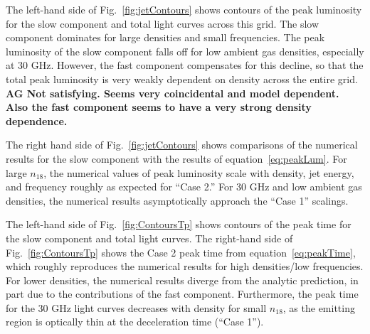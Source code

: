 \documentclass[usenatbib,fleqn]{mnras}
\begin{document}
The left-hand side of Fig.~\ref{fig:jetContours} shows contours of the
peak luminosity for the slow component and total light curves across
this grid. The slow component dominates for large
densities and small frequencies.  The peak luminosity of the slow
component falls off for low ambient gas densities, especially at 30
GHz. However, the fast component compensates for this decline, so that
the total peak luminosity is very weakly dependent on density across
the entire grid. {\bf AG Not satisfying. Seems very coincidental and
  model dependent. Also the fast component seems to have a very strong
density dependence.}

The right hand side of Fig.~\ref{fig:jetContours} shows comparisons of
the numerical results for the slow component with the results of
equation~\eqref{eq:peakLum}. For large $n_{18}$, the numerical values
of peak luminosity scale with density, jet energy, and frequency
roughly as expected for ``Case 2.'' For 30 GHz and low ambient gas
densities, the numerical results asymptotically approach the ``Case
1'' scalings.

The left-hand side of Fig.~\ref{fig:ContoursTp} shows contours of the
peak time for the slow component and total light curves. The
right-hand side of Fig.~\ref{fig:ContoursTp} shows the Case 2 peak
time from equation~\eqref{eq:peakTime}, which roughly reproduces the
numerical results for high densities/low frequencies. For lower
densities, the numerical results diverge from the analytic prediction,
in part due to the contributions of the fast component.  Furthermore,
the peak time for the 30 GHz light curves decreases with density for
small $n_{18}$, as the emitting region is optically thin at the
deceleration time (``Case 1'').
\end{document}

